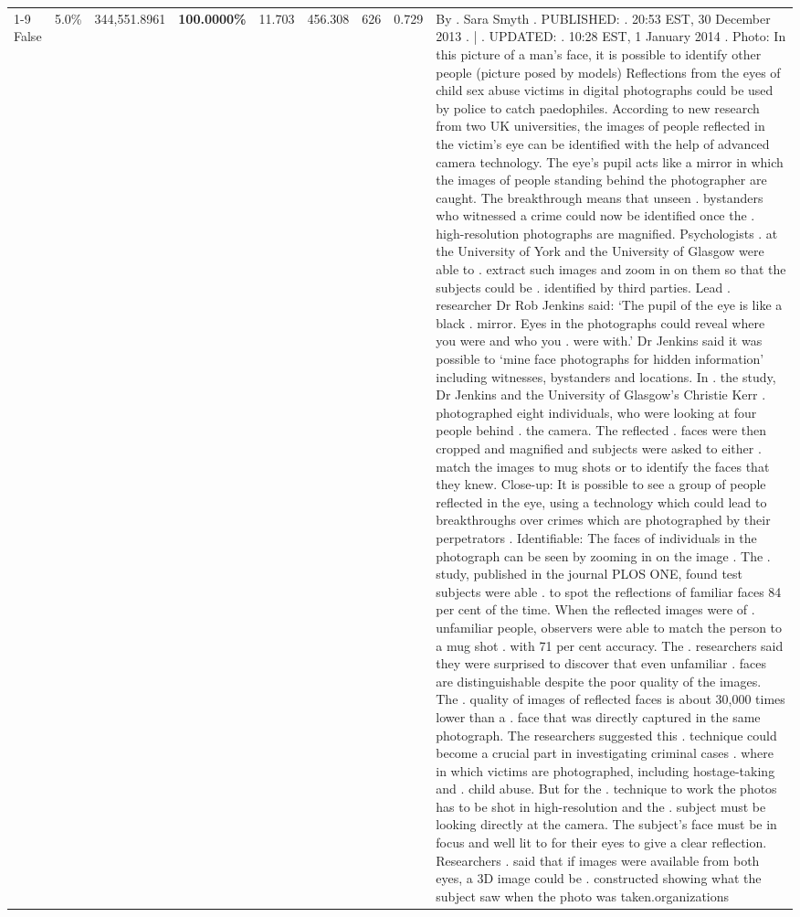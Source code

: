 \begin{table}[H]
\begin{tabular}{lllrlllll}
\cline{1-9}
False & 5.0\% & 344,551.8961 & \bfseries \color{red} 100.0000\% & 11.703 & 456.308 & 626 & 0.729 & By . Sara Smyth . PUBLISHED: . 20:53 EST, 30 December 2013 . | . UPDATED: . 10:28 EST, 1 January 2014 . Photo: In this picture of a man's face, it is possible to identify other people (picture posed by models) Reflections from the eyes of child sex abuse victims in digital photographs could be used by police to catch paedophiles. According to new research from two UK universities, the images of people reflected in the victim's eye can be identified with the help of advanced camera technology. The eye's pupil acts like a mirror in which the images of people standing behind the photographer are caught. The breakthrough means that unseen . bystanders who witnessed a crime could now be identified once the . high-resolution photographs are magnified. Psychologists . at the University of York and the University of Glasgow were able to . extract such images and zoom in on them so that the subjects could be . identified by third parties. Lead . researcher Dr Rob Jenkins said: ‘The pupil of the eye is like a black . mirror. Eyes in the photographs could reveal where you were and who you . were with.' Dr Jenkins said it was possible to ‘mine face photographs for hidden information' including witnesses, bystanders and locations. In . the study, Dr Jenkins and the University of Glasgow's Christie Kerr . photographed eight individuals, who were looking at four people behind . the camera. The reflected . faces were then cropped and magnified and subjects were asked to either . match the images to mug shots or to identify the faces that they knew. Close-up: It is possible to see a group of people reflected in the eye, using a technology which could lead to breakthroughs over crimes which are photographed by their perpetrators . Identifiable: The faces of individuals in the photograph can be seen by zooming in on the image . The . study, published in the journal PLOS ONE, found test subjects were able . to spot the reflections of familiar faces 84 per cent of the time. When the reflected images were of . unfamiliar people, observers were able to match the person to a mug shot . with 71 per cent accuracy. The . researchers said they were surprised to discover that even unfamiliar . faces are distinguishable despite the poor quality of the images. The . quality of images of reflected faces is about 30,000 times lower than a . face that was directly captured in the same photograph. The researchers suggested this . technique could become a crucial part in investigating criminal cases . where in which victims are photographed, including hostage-taking and . child abuse. But for the . technique to work the photos has to be shot in high-resolution and the . subject must be looking directly at the camera. The subject's face must be in focus and well lit to for their eyes to give a clear reflection. Researchers . said that if images were available from both eyes, a 3D image could be . constructed showing what the subject saw when the photo was taken.organizations \\

\end{tabular}
\end{table}
